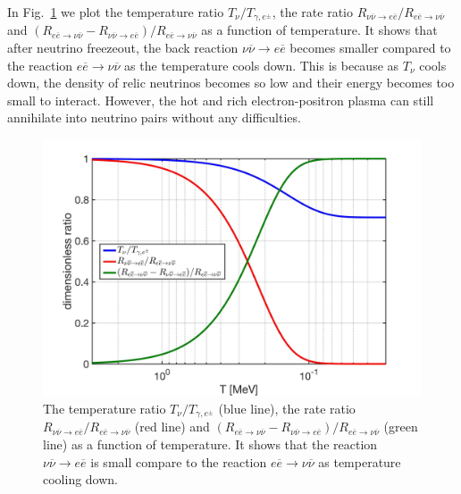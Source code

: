 In Fig.~\ref{DimensionlessRatio} we plot the temperature ratio $T_\nu/T_{\gamma,e^\pm}$, the rate ratio $R_{\nu\overline{\nu}\rightarrow e\overline{e}}/ R_{e\overline{e}\rightarrow\nu\overline{\nu}}$ and $(R_{e\overline{e}\rightarrow\nu\overline{\nu}}-R_{\nu\overline{\nu}\rightarrow e\overline{e}})/ R_{e\overline{e}\rightarrow\nu\overline{\nu}}$ as a function of temperature. It shows that after neutrino freezeout, the back reaction $\nu\overline{\nu}\rightarrow e\overline{e}$ becomes smaller compared to the reaction $e\overline{e}\rightarrow\nu\overline{\nu}$ as the temperature cools down. This is because as $T_\nu$ cools down, the density of relic neutrinos becomes so low and their energy becomes too small to interact. However, the hot and rich electron-positron plasma can still annihilate into neutrino pairs without any difficulties.
\begin{figure}[ht]
\begin{center}
\includegraphics[width=\textwidth]{./plots/DimensionlessRatio_ExtraNeutrino}
\caption{The temperature ratio $T_\nu/T_{\gamma,e^\pm}$ (blue line), the rate ratio $R_{\nu\overline{\nu}\rightarrow e\overline{e}}/ R_{e\overline{e}\rightarrow\nu\overline{\nu}}$ (red line) and $(R_{e\overline{e}\rightarrow\nu\overline{\nu}}-R_{\nu\overline{\nu}\rightarrow e\overline{e}})/ R_{e\overline{e}\rightarrow\nu\overline{\nu}}$ (green line) as a function of temperature. It shows that the reaction $\nu\overline{\nu}\rightarrow e\overline{e}$ is small compare to the reaction $e\overline{e}\rightarrow\nu\overline{\nu}$ as temperature cooling down. }
\label{DimensionlessRatio}
\end{center}
\end{figure}

